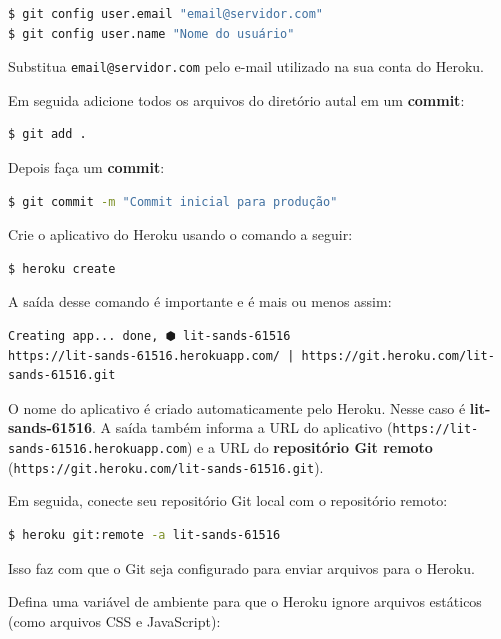 \documentclass[brazil,a4paper,oneside,openright,parskip=full]{book}
\newcommand{\passthrough}[1]{#1}
\begin{document}
\begin{lstlisting}[language=sh, style=nonumber]
$ git config user.email "email@servidor.com"
$ git config user.name "Nome do usuário"
\end{lstlisting}

Substitua \passthrough{\lstinline!email@servidor.com!} pelo e-mail
utilizado na sua conta do Heroku.

Em seguida adicione todos os arquivos do diretório autal em um
\textbf{commit}:

\begin{lstlisting}[language=sh, style=nonumber]
$ git add .
\end{lstlisting}

Depois faça um \textbf{commit}:

\begin{lstlisting}[language=sh, style=nonumber]
$ git commit -m "Commit inicial para produção"
\end{lstlisting}

Crie o aplicativo do Heroku usando o comando a seguir:

\begin{lstlisting}[language=sh, style=nonumber]
$ heroku create
\end{lstlisting}

A saída desse comando é importante e é mais ou menos assim:

\begin{lstlisting}[style=nonumber]
Creating app... done, ⬢ lit-sands-61516
https://lit-sands-61516.herokuapp.com/ | https://git.heroku.com/lit-sands-61516.git
\end{lstlisting}

O nome do aplicativo é criado automaticamente pelo Heroku. Nesse caso é
\textbf{lit-sands-61516}. A saída também informa a URL do aplicativo
(\passthrough{\lstinline!https://lit-sands-61516.herokuapp.com!}) e a
URL do \textbf{repositório Git remoto}
(\passthrough{\lstinline!https://git.heroku.com/lit-sands-61516.git!}).

Em seguida, conecte seu repositório Git local com o repositório remoto:

\begin{lstlisting}[language=sh, style=nonumber]
$ heroku git:remote -a lit-sands-61516
\end{lstlisting}

Isso faz com que o Git seja configurado para enviar arquivos para o
Heroku.

Defina uma variável de ambiente para que o Heroku ignore arquivos
estáticos (como arquivos CSS e JavaScript):
\end{document}
